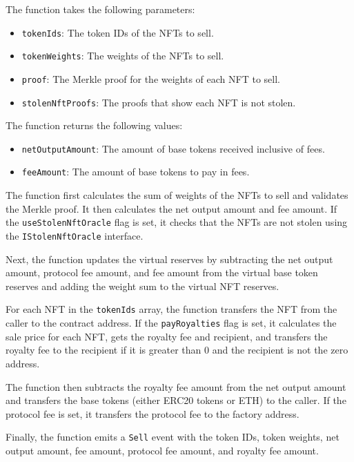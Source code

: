 The function takes the following parameters:

\begin{itemize}
\tightlist
\item
  \texttt{tokenIds}: The token IDs of the NFTs to sell.
\item
  \texttt{tokenWeights}: The weights of the NFTs to sell.
\item
  \texttt{proof}: The Merkle proof for the weights of each NFT to sell.
\item
  \texttt{stolenNftProofs}: The proofs that show each NFT is not stolen.
\end{itemize}

The function returns the following values:

\begin{itemize}
\tightlist
\item
  \texttt{netOutputAmount}: The amount of base tokens received inclusive
  of fees.
\item
  \texttt{feeAmount}: The amount of base tokens to pay in fees.
\end{itemize}

The function first calculates the sum of weights of the NFTs to sell and
validates the Merkle proof. It then calculates the net output amount and
fee amount. If the \texttt{useStolenNftOracle} flag is set, it checks
that the NFTs are not stolen using the \texttt{IStolenNftOracle}
interface.

Next, the function updates the virtual reserves by subtracting the net
output amount, protocol fee amount, and fee amount from the virtual base
token reserves and adding the weight sum to the virtual NFT reserves.

For each NFT in the \texttt{tokenIds} array, the function transfers the
NFT from the caller to the contract address. If the
\texttt{payRoyalties} flag is set, it calculates the sale price for each
NFT, gets the royalty fee and recipient, and transfers the royalty fee
to the recipient if it is greater than 0 and the recipient is not the
zero address.

The function then subtracts the royalty fee amount from the net output
amount and transfers the base tokens (either ERC20 tokens or ETH) to the
caller. If the protocol fee is set, it transfers the protocol fee to the
factory address.

Finally, the function emits a \texttt{Sell} event with the token IDs,
token weights, net output amount, fee amount, protocol fee amount, and
royalty fee amount.

